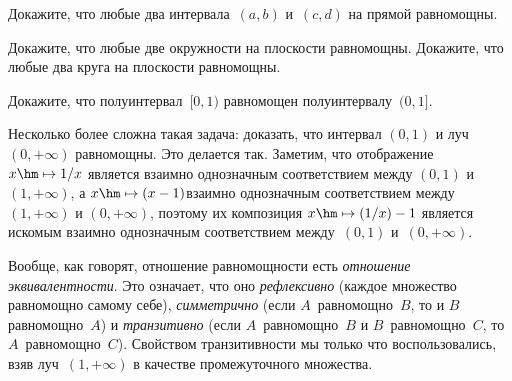 \begin{problem}
Докажите, что любые два интервала~$(a,b)$ и~$(c,d)$
на прямой равномощны.
\end{problem}

\begin{problem}
Докажите, что любые две окружности на плоскости равномощны.
Докажите, что любые два круга на плоскости равномощны.
\end{problem}

\begin{problem}
Докажите, что полуинтервал~$[0,1)$ равномощен полуинтервалу~$(0,1]$.
\end{problem}

Несколько более сложна такая задача: доказать, что интервал
$(0,1)$ и луч $(0,+\infty)$ равномощны. Это делается так.
Заметим, что отображение $x\hm\mapsto 1/x$ является взаимно
однозначным соответствием между $(0,1)$ и $(1,+\infty)$, а
$x\hm\mapsto (x-1)$\т взаимно однозначным соответствием между
$(1,+\infty)$ и $(0,+\infty)$, поэтому их композиция
$x\hm\mapsto (1/x)-1$ является искомым взаимно однозначным
соответствием между~$(0,1)$ и~$(0,+\infty)$.

Вообще, как говорят, отношение равномощности есть
\emph{отношение
эквивалентности}. Это означает,
что оно \emph{рефлексивно} (каждое
множество равномощно самому себе),
\emph{симметрично} (если
$A$~равномощно~$B$, то и $B$ равномощно~$A$) и
\emph{транзитивно} (если
$A$~равномощно~$B$ и $B$~равномощно~$C$, то $A$~равномощно~$C$).
Свойством транзитивности мы только что воспользовались, взяв
луч~$(1,+\infty)$ в качестве промежуточного множества.


